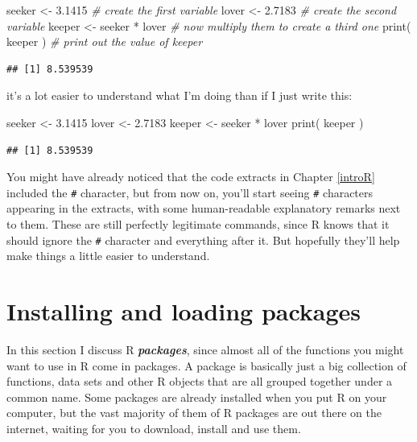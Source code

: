 \documentclass[
]{book}
\newenvironment{Shaded}{\begin{snugshade}}{\end{snugshade}}
\newcommand{\CommentTok}[1]{\textcolor[rgb]{0.56,0.35,0.01}{\textit{#1}}}
\newcommand{\FloatTok}[1]{\textcolor[rgb]{0.00,0.00,0.81}{#1}}
\newcommand{\FunctionTok}[1]{\textcolor[rgb]{0.00,0.00,0.00}{#1}}
\newcommand{\NormalTok}[1]{#1}
\newcommand{\OtherTok}[1]{\textcolor[rgb]{0.56,0.35,0.01}{#1}}
\newcommand{\SpecialCharTok}[1]{\textcolor[rgb]{0.00,0.00,0.00}{#1}}
\begin{document}
\begin{Shaded}
\begin{Highlighting}[]
\NormalTok{seeker }\OtherTok{\textless{}{-}} \FloatTok{3.1415}           \CommentTok{\# create the first variable}
\NormalTok{lover }\OtherTok{\textless{}{-}} \FloatTok{2.7183}            \CommentTok{\# create the second variable}
\NormalTok{keeper }\OtherTok{\textless{}{-}}\NormalTok{ seeker }\SpecialCharTok{*}\NormalTok{ lover   }\CommentTok{\# now multiply them to create a third one}
\FunctionTok{print}\NormalTok{( keeper )            }\CommentTok{\# print out the value of \textquotesingle{}keeper\textquotesingle{}}
\end{Highlighting}
\end{Shaded}

\begin{verbatim}
## [1] 8.539539
\end{verbatim}

it's a lot easier to understand what I'm doing than if I just write this:

\begin{Shaded}
\begin{Highlighting}[]
\NormalTok{seeker }\OtherTok{\textless{}{-}} \FloatTok{3.1415}
\NormalTok{lover }\OtherTok{\textless{}{-}} \FloatTok{2.7183}
\NormalTok{keeper }\OtherTok{\textless{}{-}}\NormalTok{ seeker }\SpecialCharTok{*}\NormalTok{ lover}
\FunctionTok{print}\NormalTok{( keeper )    }
\end{Highlighting}
\end{Shaded}

\begin{verbatim}
## [1] 8.539539
\end{verbatim}

You might have already noticed that the code extracts in Chapter \ref{introR} included the \texttt{\#} character, but from now on, you'll start seeing \texttt{\#} characters appearing in the extracts, with some human-readable explanatory remarks next to them. These are still perfectly legitimate commands, since R knows that it should ignore the \texttt{\#} character and everything after it. But hopefully they'll help make things a little easier to understand.

\hypertarget{packageinstall}{%
\section{Installing and loading packages}\label{packageinstall}}

In this section I discuss R \textbf{\emph{packages}}, since almost all of the functions you might want to use in R come in packages. A package is basically just a big collection of functions, data sets and other R objects that are all grouped together under a common name. Some packages are already installed when you put R on your computer, but the vast majority of them of R packages are out there on the internet, waiting for you to download, install and use them.
\end{document}
